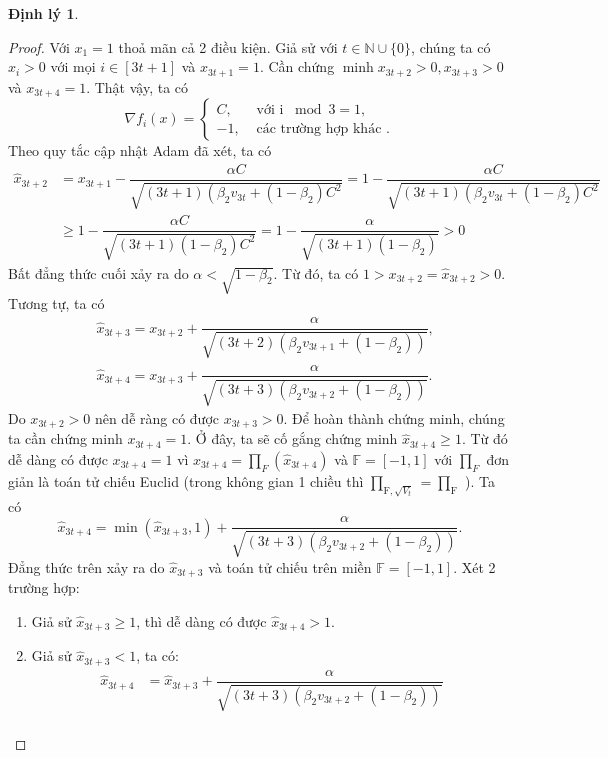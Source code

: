 \documentclass[11pt,oneside,a4paper]{report}
\theoremstyle{definition}
\newtheorem{dl}{Định lý}[section]
\begin{document}
\begin{dl}
\begin{proof}
Với $x_1=1$ thoả mãn cả 2 điều kiện.
Giả sử với $t \in \mathbb{N} \cup\{0\}$, chúng ta có $x_i>0$ với mọi $i \in[3 t+1]$ và $x_{3 t+1}=1$. Cần chứng $\operatorname{minh} x_{3 t+2}>0, x_{3 t+3}>0$ và $x_{3 t+4}=1$.
Thật vậy, ta có
$$
\nabla f_i(x)=\left\{\begin{array}{cc}
C, & \text { với i } \bmod 3=1 ,\\
-1, & \text { các trường hợp khác }.
\end{array}\right.
$$
Theo quy tắc cập nhật Adam đã xét, ta có
$$
\begin{aligned}
\hat{x}_{3 t+2} &=x_{3 t+1}-\dfrac{\alpha C}{\sqrt{(3 t+1)\left(\beta_2 v_{3 t}+\left(1-\beta_2\right) C^2\right.}}=1-\dfrac{\alpha C}{\sqrt{(3 t+1)\left(\beta_2 v_{3 t}+\left(1-\beta_2\right) C^2\right.}} \\
& \geq 1-\dfrac{\alpha C}{\sqrt{(3 t+1)\left(1-\beta_2\right) C^2}}=1-\dfrac{\alpha}{\sqrt{(3 t+1)\left(1-\beta_2\right)}}>0
\end{aligned}
$$
Bất đẳng thức cuối xảy ra do $\alpha<\sqrt{1-\beta_2}$. Từ đó, ta có $1>x_{3 t+2}=\hat{x}_{3 t+2}>0$. Tương tự, ta có
$$
\begin{aligned}
&\hat{x}_{3 t+3}=x_{3 t+2}+\dfrac{\alpha}{\sqrt{(3 t+2)\left(\beta_2 v_{3 t+1}+\left(1-\beta_2\right)\right)}}, \\
&\hat{x}_{3 t+4}=x_{3 t+3}+\dfrac{\alpha}{\sqrt{(3 t+3)\left(\beta_2 v_{3 t+2}+\left(1-\beta_2\right)\right)}}.
\end{aligned}
$$
Do $x_{3 t+2}>0$ nên dễ ràng có được $x_{3 t+3}>0$. Để hoàn thành chứng minh, chúng ta cần chứng minh $x_{3 t+4}=1$. Ở đây, ta sẽ cố gắng chứng minh $\hat{x}_{3 t+4} \geq 1$. Từ đó dễ dàng có được $x_{3 t+4}=1$ vì $x_{3 t+4}=\prod_F\left(\hat{x}_{3 t+4}\right)$ và $\mathbb{F}=[-1,1]$ với $\prod_F$ đơn giản là toán tử chiếu Euclid (trong không gian 1 chiều thì $\prod_{\mathrm{F}, \sqrt{V_t}}=\prod_{\mathrm{F}}$ ). Ta có
$$
\hat{x}_{3 t+4}=\min \left(\hat{x}_{3 t+3}, 1\right)+\dfrac{\alpha}{\sqrt{(3 t+3)\left(\beta_2 v_{3 t+2}+\left(1-\beta_2\right)\right)}}.
$$
Đẳng thức trên xảy ra do $\hat{x}_{3 t+3}$ và toán tử chiếu trên miền $\mathbb{F}=[-1,1]$.
Xét 2 trường hợp: 
\begin{enumerate}
\item Giả sử $\hat{x}_{3 t+3} \geq 1$, thì dễ dàng có được $\hat{x}_{3 t+4}>1$.
\item Giả sử $\hat{x}_{3 t+3}<1$, ta có:
\begin{align}
\hat{x}_{3 t+4} &=\hat{x}_{3 t+3}+\dfrac{\alpha}{\sqrt{(3 t+3)\left(\beta_2 v_{3 t+2}+\left(1-\beta_2\right)\right)}} \nonumber\\

\end{align}
\end{enumerate}
\end{proof}
\end{dl}
\end{document}
